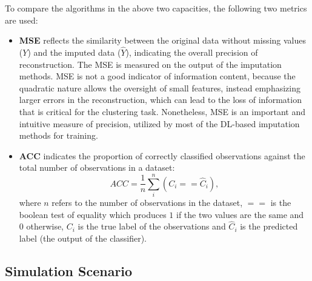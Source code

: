 				To compare the algorithms in the above two capacities, the following two metrics are used:
				\begin{itemize}
					\item
						\textbf{\ac{MSE}} reflects the similarity between the original data without missing values ($Y$) and the imputed data ($\hat{Y}$), indicating the overall precision of reconstruction.
						The \ac{MSE} is measured on the output of the imputation methods.
						\ac{MSE} is not a good indicator of information content, because the quadratic nature allows the oversight of small features, instead emphasizing larger errors in the reconstruction, which can lead to the loss of information that is critical for the clustering task.
						Nonetheless, \ac{MSE} is an important and intuitive measure of precision, utilized by most of the \ac{DL}-based imputation methods for training.
					
					\item
						\textbf{\ac{ACC}} indicates the proportion of correctly classified observations against the total number of observations in a dataset:
						\begin{equation}
							ACC = \frac{1}{n} \sum_{i}^{n} (C_i == \hat{C}_i),
						\end{equation}
						\noindent{}where $n$ refers to the number of observations in the dataset, $==$ is the boolean test of equality which produces $1$ if the two values are the same and $0$ otherwise, $C_i$ is the true label of the observations and $\hat{C}_i$ is the predicted label (the output of the classifier).
				\end{itemize}	
			
			\subsection{Simulation Scenario}
			
